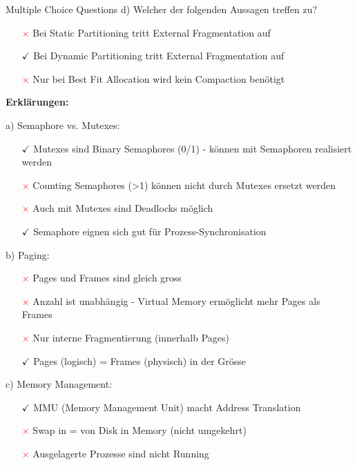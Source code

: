 \begin{example2}{Multiple Choice Questions}
    d) Welcher der folgenden Aussagen treffen zu?
    \begin{itemize}
        \item[\textcolor{red}{$\times$}] Bei Static Partitioning tritt External Fragmentation auf
        \item[\textcolor{frog}{$\checkmark$}] Bei Dynamic Partitioning tritt External Fragmentation auf  
        \item[\textcolor{red}{$\times$}] Nur bei Best Fit Allocation wird kein Compaction benötigt
    \end{itemize}
    
    \tcblower
    
    \textbf{Erklärungen:}
    
    a) Semaphore vs. Mutexes:
    \begin{itemize}
        \item[\textcolor{frog}{$\checkmark$}] Mutexes sind Binary Semaphores (0/1) - können mit Semaphoren realisiert werden
        \item[\textcolor{red}{$\times$}] Counting Semaphores (>1) können nicht durch Mutexes ersetzt werden
        \item[\textcolor{red}{$\times$}] Auch mit Mutexes sind Deadlocks möglich
        \item[\textcolor{frog}{$\checkmark$}] Semaphore eignen sich gut für Prozess-Synchronisation
    \end{itemize}
    
    b) Paging:
    \begin{itemize}
        \item[\textcolor{red}{$\times$}] Pages und Frames sind gleich gross
        \item[\textcolor{red}{$\times$}] Anzahl ist unabhängig - Virtual Memory ermöglicht mehr Pages als Frames
        \item[\textcolor{red}{$\times$}] Nur interne Fragmentierung (innerhalb Pages)
        \item[\textcolor{frog}{$\checkmark$}] Pages (logisch) = Frames (physisch) in der Grösse
    \end{itemize}
    
    c) Memory Management:
    \begin{itemize}
        \item[\textcolor{frog}{$\checkmark$}] MMU (Memory Management Unit) macht Address Translation
        \item[\textcolor{red}{$\times$}] Swap in = von Disk in Memory (nicht umgekehrt)
        \item[\textcolor{red}{$\times$}] Ausgelagerte Prozesse sind nicht Running
    \end{itemize}
    

\end{example2}
